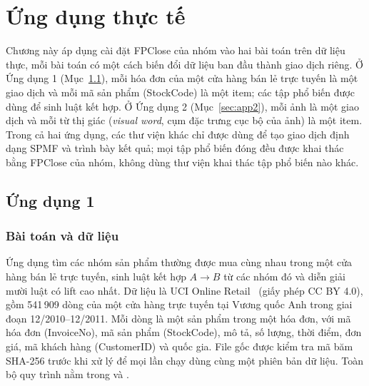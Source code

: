 
\section{\texorpdfstring{Ứng dụng thực tế}{CHƯƠNG 3: ỨNG DỤNG THỰC TẾ}}
\label{sec:applications}

Chương này áp dụng cài đặt FPClose của nhóm vào hai bài toán trên dữ liệu thực, mỗi bài toán có một cách biến đổi dữ
liệu ban đầu thành giao dịch riêng. Ở Ứng dụng 1 (Mục~\ref{sec:app1}), mỗi hóa đơn của một cửa hàng bán lẻ trực tuyến
là một giao dịch và mỗi mã sản phẩm (StockCode) là một item; các tập phổ biến được dùng để sinh luật kết hợp. Ở Ứng
dụng 2 (Mục~\ref{sec:app2}), mỗi ảnh là một giao dịch và mỗi từ thị giác (\textit{visual word}, cụm đặc trưng cục bộ
của ảnh) là một item. Trong cả hai ứng dụng, các thư viện khác chỉ được dùng để tạo giao dịch định dạng SPMF và trình
bày kết quả; mọi tập phổ biến đóng đều được khai thác bằng FPClose của nhóm, không dùng thư viện khai thác tập phổ biến
nào khác.

\subsection{Ứng dụng 1}
\label{sec:app1}
\subsubsection{Bài toán và dữ liệu}
Ứng dụng tìm các nhóm sản phẩm thường được mua cùng nhau trong một cửa hàng bán lẻ trực tuyến, sinh luật kết hợp
$A \rightarrow B$ từ các nhóm đó và diễn giải mười luật có lift cao nhất. Dữ liệu là UCI Online Retail~\cite{uci_retail}
(giấy phép CC BY 4.0), gồm 541\,909 dòng của một cửa hàng trực tuyến tại Vương quốc Anh trong giai đoạn 12/2010--12/2011.
Mỗi dòng là một sản phẩm trong một hóa đơn, với mã hóa đơn (InvoiceNo), mã sản phẩm (StockCode), mô tả, số lượng, thời
điểm, đơn giá, mã khách hàng (CustomerID) và quốc gia. File gốc được kiểm tra mã băm SHA-256 trước khi xử lý để mọi lần
chạy dùng cùng một phiên bản dữ liệu. Toàn bộ quy trình nằm trong  và
.

